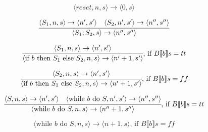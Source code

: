 \[
\langle reset,n,s \rangle \rightarrow
\langle 0, s \rangle
\]

\[
\cfrac{
  \langle S_1,n,s \rangle \rightarrow
  \langle n',s' \rangle
  \quad
  \langle S_2,n',s' \rangle \rightarrow
  \langle n'',s'' \rangle
}{
  \langle S_1;S_2,s \rangle \rightarrow
  \langle n'', s'' \rangle
}
\]

\[
\cfrac{
  \langle S_1,n,s \rangle \rightarrow
  \langle n',s' \rangle
}{
  \langle \text{if\ } b \text{\ then\ } S_1
    \text{\ else\ } S_2,n,s \rangle
  \rightarrow
  \langle n' + 1, s' \rangle
}\text{,\ if } B \llbracket b \rrbracket s = tt
\]

\[
\cfrac{
  \langle S_2,n,s \rangle \rightarrow
  \langle n',s' \rangle
}{
  \langle \text{if\ } b \text{\ then\ } S_1
    \text{\ else\ } S_2,n,s \rangle
  \rightarrow
  \langle n' + 1, s' \rangle
}\text{,\ if } B \llbracket b \rrbracket s = ff
\]


\[
\cfrac{
  \langle S,n,s \rangle \rightarrow
  \langle n',s' \rangle
  \quad
  \langle \text{while\ } b \text{\ do\ } S,n',s' \rangle
  \rightarrow
  \langle n'', s'' \rangle
}{
  \langle \text{while\ } b \text{\ do\ } S,n,s \rangle
  \rightarrow
  \langle n'' + 1, s'' \rangle
}\text{,\ if } B \llbracket b \rrbracket s = tt
\]

\[
\langle \text{while\ } b \text{\ do\ } S,n,s \rangle
\rightarrow
\langle n + 1, s \rangle
\text{,\ if } B \llbracket b \rrbracket s = ff
\]
